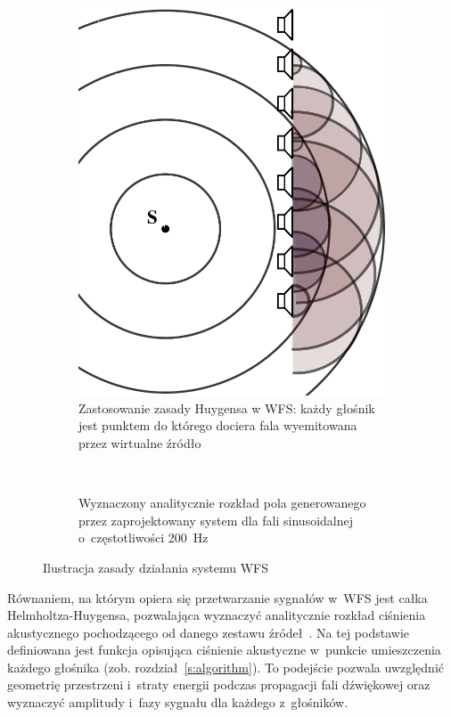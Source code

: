 \documentclass[10pt, a4paper]{article}
\begin{document}
\begin{figure}[!tbh]
  \centering
  \begin{subfigure}[b]{.49\textwidth}
    \centering
    \includegraphics[scale=.35]{vecgraphics/WFS_idea.pdf}
    \caption{Zastosowanie zasady Huygensa w WFS: każdy głośnik jest punktem do
    którego dociera fala wyemitowana przez wirtualne źródło}
    \label{r:Huygens}
  \end{subfigure}
  ~
  \begin{subfigure}[b]{.49\textwidth}
    \centering
    \caption{Wyznaczony analitycznie rozkład pola generowanego przez zaprojektowany system dla fali sinusoidalnej o~częstotliwości \SI{200}{\hertz}}
    \label{r:symulacja}
  \end{subfigure}
  \caption{Ilustracja zasady działania systemu WFS}
\end{figure}

Równaniem, na którym opiera się przetwarzanie sygnałów w~WFS jest całka
Helmholtza-Huygensa,
pozwalająca wyznaczyć analitycznie rozkład ciśnienia akustycznego pochodzącego od danego
zestawu źródeł~\cite{snaka}. Na tej podstawie definiowana jest funkcja
opisująca ciśnienie akustyczne w~punkcie umieszczenia każdego głośnika (zob. rozdział~\ref{s:algorithm}). To
podejście pozwala uwzględnić geometrię przestrzeni i~straty energii podczas
propagacji fali dźwiękowej oraz wyznaczyć amplitudy i~fazy sygnału dla każdego
z~głośników. 
\end{document}
